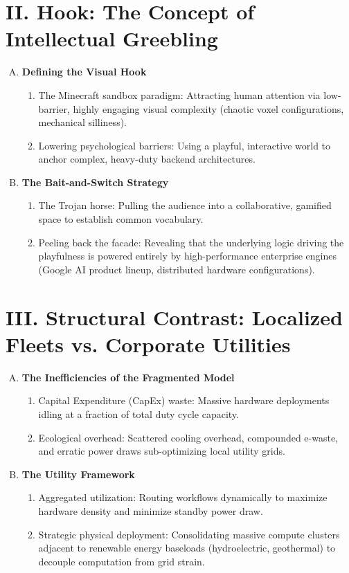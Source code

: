 \documentclass{article}
\begin{document}
	\section*{II. Hook: The Concept of Intellectual Greebling}
	\begin{enumerate}[A.]
		\item \textbf{Defining the Visual Hook}
		\begin{enumerate}[1.]
			\item The Minecraft sandbox paradigm: Attracting human attention via low-barrier, highly engaging visual complexity (chaotic voxel configurations, mechanical silliness).
			\item Lowering psychological barriers: Using a playful, interactive world to anchor complex, heavy-duty backend architectures.
		\end{enumerate}
		\item \textbf{The Bait-and-Switch Strategy}
		\begin{enumerate}[1.]
			\item The Trojan horse: Pulling the audience into a collaborative, gamified space to establish common vocabulary.
			\item Peeling back the facade: Revealing that the underlying logic driving the playfulness is powered entirely by high-performance enterprise engines (Google AI product lineup, distributed hardware configurations).
		\end{enumerate}
	\end{enumerate}
	
	\section*{III. Structural Contrast: Localized Fleets vs. Corporate Utilities}
	\begin{enumerate}[A.]
		\item \textbf{The Inefficiencies of the Fragmented Model}
		\begin{enumerate}[1.]
			\item Capital Expenditure (CapEx) waste: Massive hardware deployments idling at a fraction of total duty cycle capacity.
			\item Ecological overhead: Scattered cooling overhead, compounded e-waste, and erratic power draws sub-optimizing local utility grids.
		\end{enumerate}
		\item \textbf{The Utility Framework}
		\begin{enumerate}[1.]
			\item Aggregated utilization: Routing workflows dynamically to maximize hardware density and minimize standby power draw.
			\item Strategic physical deployment: Consolidating massive compute clusters adjacent to renewable energy baseloads (hydroelectric, geothermal) to decouple computation from grid strain.
		\end{enumerate}
	\end{enumerate}
	
\end{document}
